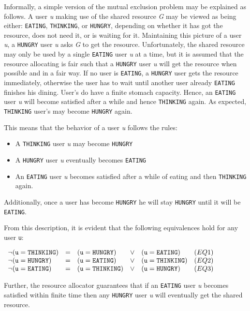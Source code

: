 Informally, a simple version of the mutual exclusion problem may be explained
as follows.  A user {\it u} making use of the shared resource {\it G} may be
viewed as being either: {\tt EATING}, {\tt THINKING}, or {\tt HUNGRY},
depending on whether it has got the resource, does not need it, or is waiting
for it.  Maintaining this picture of a user {\it u}, a {\tt HUNGRY} user
{\it u}
asks {\it G} to get the resource.  Unfortunately, the shared resource may only
be used by a single {\tt EATING} user {\it u} at a time, but it is assumed that
the resource allocating is fair such that a {\tt HUNGRY} user {\it u} will get
the resource when possible and in a fair way. If no user is {\tt EATING},
a {\tt HUNGRY} user gets the resource immediately, otherwise the
user has to wait until another user already {\tt EATING} finishes
his dining.  User's do have a finite stomach capacity. Hence, an {\tt EATING} 
user {\it u} will become satisfied after a while and hence {\tt THINKING}
again.  As expected, {\tt THINKING} user's may become {\tt HUNGRY} again.

This means that the behavior of a user {\it u} follows the rules:
\begin{itemize}
  \item A {\tt THINKING} user {\it u} may become {\tt HUNGRY}
  \item A {\tt HUNGRY} user {\it u} eventually becomes {\tt EATING}
  \item An {\tt EATING} user {\it u} becomes satisfied after a while of eating 
        and then {\tt THINKING} again.
\end{itemize}

Additionally, once a user has become {\tt HUNGRY} he will stay 
{\tt HUNGRY} until it will be {\tt EATING}.

From this description, it is evident that the following equivalences hold for
any user {\tt u}:

\cn $\begin{array}{llllll}
 {\tt \neg(u = THINKING)} & = & {\tt (u = HUNGRY)}   & \vee &
                       {\tt (u = EATING)} & (EQ1)\\
 {\tt \neg(u = HUNGRY)}   & = & {\tt (u = EATING)}   & \vee &
                       {\tt (u = THINKING)} & (EQ2)\\
 {\tt \neg(u = EATING)}   & = & {\tt (u = THINKING)} & \vee &
                       {\tt (u = HUNGRY)} & (EQ3)
\end{array}$

Further, the resource allocator guarantees that if an {\tt EATING} user {\it u}
becomes satisfied within finite time then any {\tt HUNGRY} user {\it u} will 
eventually get the shared resource.

